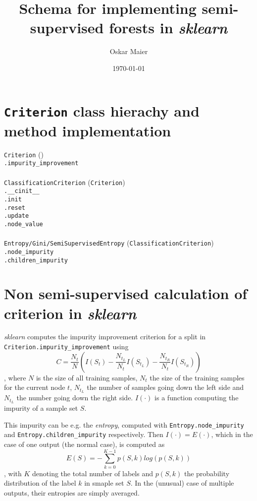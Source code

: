 \documentclass[a4paper,10pt]{article}
\title{Schema for implementing semi-supervised forests in \textit{sklearn}}
\author{Oskar Maier}
\date{\today}
\begin{document}
\maketitle

\section{\texttt{Criterion} class hierachy and method implementation}
\noindent\texttt{Criterion} ()\\
\indent\texttt{.impurity\_improvement}\\
\\
\noindent\texttt{ClassificationCriterion} (\texttt{Criterion})\\
\indent\texttt{.\_\_cinit\_\_}\\
\indent\texttt{.init}\\
\indent\texttt{.reset}\\
\indent\texttt{.update}\\
\indent\texttt{.node\_value}\\
\\
\noindent\texttt{Entropy/Gini/SemiSupervisedEntropy} (\texttt{ClassificationCriterion})\\
\indent\texttt{.node\_impurity}\\
\indent\texttt{.children\_impurity}\\

\section{Non semi-supervised calculation of criterion in \textit{sklearn}}
\textit{sklearn} computes the impurity improvement criterion for a split in \texttt{Criterion.impurity\_improvement} using
\begin{equation}\label{eq:criterion:old}
  C=\frac{N_t}{N}\left(I(S_t) - \frac{N_{t_L}}{N_t} I(S_{t_L}) - \frac{N_{t_R}}{N_t} I(S_{t_R})\right)
\end{equation}
, where $N$ is the size of all training samples, $N_t$ the size of the training samples for the current node $t$, $N_{t_L}$ the number of samples going down the left side and $N_{t_L}$ the number going down the right side. $I(\cdot)$ is a function computing the impurity of a sample set $S$.

This impurity can be e.g. the \textit{entropy}, computed with \texttt{Entropy.node\_impurity} and \texttt{Entropy.children\_impurity} respectively. Then $I(\cdot)=E(\cdot)$, which in the case of one output (the normal case), is computed as
\begin{equation}\label{eq:entropy}
  E(S) = - \sum_{k=0}^{K-1} p(S,k) log(p(S,k))
\end{equation}
, with $K$ denoting the total number of labels and $p(S,k)$ the probability distribution of the label $k$ in smaple set $S$. In the (unusual) case of multiple outputs, their entropies are simply averaged.
\end{document}
